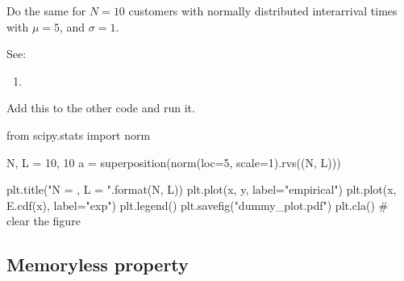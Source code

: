 \documentclass{scrartcl}
\begin{document}
\begin{exercise}
  Do the same for $N=10$ customers with normally distributed interarrival times with $\mu=5$, and $\sigma =1$.

See:
\begin{enumerate}
\item {}
\end{enumerate}

\begin{solution}
Add this to the other code and run it. 
\begin{pyverbatim}
from scipy.stats import norm

N, L = 10, 10
a = superposition(norm(loc=5, scale=1).rvs((N, L)))

plt.title("N = {}, L = {}".format(N, L))
plt.plot(x, y,  label="empirical")
plt.plot(x, E.cdf(x),  label="exp")
plt.legend()
plt.savefig("dummy_plot.pdf")
plt.cla() # clear the figure
\end{pyverbatim}

\end{solution}
\end{exercise}


\subsection{Memoryless property}







\end{document}
